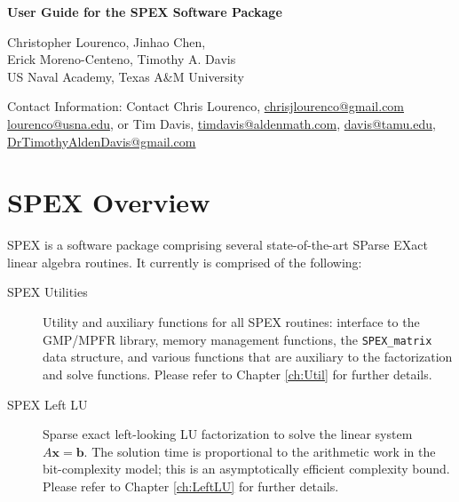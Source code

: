 \documentclass[12pt]{report}
\theoremstyle{definition}
\begin{document}
\begin{center}
\begin{large}
\textbf{User Guide for the SPEX Software Package} \\
\vspace{5mm}

\vspace{20mm}

Christopher Lourenco, Jinhao Chen, \\ Erick Moreno-Centeno, Timothy A. Davis \\

US Naval Academy, Texas A\&M University

\vspace{20mm}
Contact Information: Contact Chris Lourenco, \href{mailto:chrisjlourenco@gmail.com}{chrisjlourenco@gmail.com} \href{mailto:lourenco@usna.edu}{lourenco@usna.edu}, or Tim Davis,
\href{mailto:timdavis@aldenmath.com}{timdavis@aldenmath.com},
\href{mailto:davis@tamu.edu}{davis@tamu.edu},
\href{DrTimothyAldenDavis@gmail.com}{DrTimothyAldenDavis@gmail.com}

\end{large}
\end{center}

\newpage
\tableofcontents

\newpage
    
\chapter{SPEX Overview}

SPEX is a software package comprising several state-of-the-art SParse EXact
linear algebra routines. It currently is comprised of the following:

\begin{description}
\item[SPEX Utilities] Utility and auxiliary functions for all SPEX routines: interface to the GMP/MPFR library, memory management functions, the \verb|SPEX_matrix| data structure, and various functions that are auxiliary to the factorization and solve functions. Please refer to Chapter \ref{ch:Util} for further details.
\item[SPEX Left LU] Sparse exact left-looking LU factorization to solve the linear system $A \mathbf{x} = \mathbf{b}$. The solution time is proportional to the arithmetic work in the bit-complexity model; this is an asymptotically efficient complexity bound. Please refer to Chapter \ref{ch:LeftLU} for further details.
\end{description}
\end{document}
